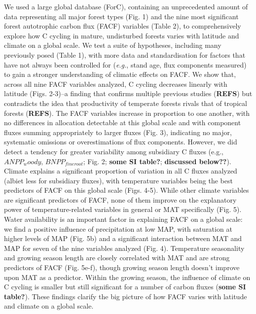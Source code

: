 \documentclass[]{article}
\begin{document}
We used a large global database (ForC), containing an unprecedented
amount of data representing all major forest types (Fig. 1) and the nine
most significant forest autotrophic carbon flux (FACF) variables (Table
2), to comprehensively explore how C cycling in mature, undisturbed
forests varies with latitude and climate on a global scale. We test a
suite of hypotheses, including many previously posed (Table 1), with
more data and standardisation for factors that have not always been
controlled for (\emph{e.g.}, stand age, flux components measured) to
gain a stronger understanding of climatic effects on FACF. We show that,
across all nine FACF variables analyzed, C cycling decreases linearly
with latitude (Figs. 2-3)--a finding that confirms multiple previous
studies (\textbf{REFS}) but contradicts the idea that productivity of
temperate forests rivals that of tropical forests (\textbf{REFS}). The
FACF variables increase in proportion to one another, with no
differences in allocation detectable at this global scale and with
component fluxes summing appropriately to larger fluxes (Fig. 3),
indicating no major, systematic omissions or overestimations of flux
components. However, we did detect a tendency for greater variability
among subsidiary C fluxes (e.g., \emph{\(ANPP_woody\)},
\emph{\(BNPP_{fine root}\)}; Fig. 2; \textbf{some SI table?};
\textbf{discussed below??}). Climate explains a significant proportion
of variation in all C fluxes analyzed (albiet less for subsidiary
fluxes), with temperature variables being the best predictors of FACF on
this global scale (Figs. 4-5). While other climate variables are
significant predictors of FACF, none of them improve on the explanatory
power of temperature-related variables in general or MAT specifically
(Fig. 5). Water availability is an important factor in explaining FACF
on a global scale: we find a positive influence of precipitation at low
MAP, with saturation at higher levels of MAP (Fig. 5b) and a significant
interaction between MAT and MAP for seven of the nine variables analyzed
(Fig. 4). Temperature seasonality and growing season length are closely
correlated with MAT and are strong predictors of FACF (Fig. 5e-f),
though growing season length doesn't improve upon MAT as a predictor.
Within the growing season, the influence of climate on C cycling is
smaller but still significant for a number of carbon fluxes
(\textbf{some SI table?}). These findings clarify the big picture of how
FACF varies with latitude and climate on a global scale.
\end{document}
